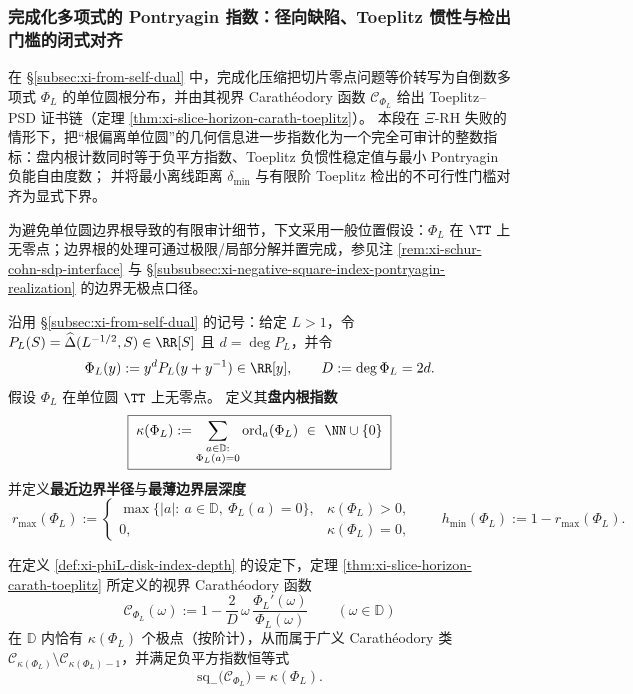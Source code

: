 \subsubsection{完成化多项式的 Pontryagin 指数：径向缺陷、Toeplitz 惯性与检出门槛的闭式对齐}\label{subsubsec:xi-completed-polynomial-pontryagin-index}
在 \S\ref{subsec:xi-from-self-dual} 中，完成化压缩把切片零点问题等价转写为自倒数多项式 \(\Phi_L\) 的单位圆根分布，并由其视界 Carath\'eodory 函数 \(\mathscr{C}_{\Phi_L}\) 给出 Toeplitz--PSD 证书链（定理 \ref{thm:xi-slice-horizon-carath-toeplitz}）。
本段在 \(\Xi\)-RH 失败的情形下，把“根偏离单位圆”的几何信息进一步指数化为一个完全可审计的整数指标：盘内根计数同时等于负平方指数、Toeplitz 负惯性稳定值与最小 Pontryagin 负能自由度数；
并将最小离线距离 \(\delta_{\min}\) 与有限阶 Toeplitz 检出的不可行性门槛对齐为显式下界。
\par
为避免单位圆边界根导致的有限审计细节，下文采用一般位置假设：\(\Phi_L\) 在 \(\TT\) 上无零点；边界根的处理可通过极限/局部分解并置完成，参见注 \ref{rem:xi-schur-cohn-sdp-interface} 与 \S\ref{subsubsec:xi-negative-square-index-pontryagin-realization} 的边界无极点口径。

\begin{definition}[盘内根指数与最近边界深度]\label{def:xi-phiL-disk-index-depth}
沿用 \S\ref{subsec:xi-from-self-dual} 的记号：给定 \(L>1\)，令
\(
P_L(S)=\widehat\Delta(L^{-1/2},S)\in\RR[S]
\)
且 \(d=\deg P_L\)，并令
\[
\Phi_L(y):=y^{d}P_L(y+y^{-1})\in\RR[y],\qquad D:=\deg\Phi_L=2d.
\]
假设 \(\Phi_L\) 在单位圆 \(\TT\) 上无零点。
定义其\textbf{盘内根指数}
\[
\boxed{\;
\kappa(\Phi_L):=\sum_{\substack{a\in\mathbb{D}:\\ \Phi_L(a)=0}}\operatorname{ord}_{a}(\Phi_L)\ \in\ \NN\cup\{0\}\;}
\]
并定义\textbf{最近边界半径}与\textbf{最薄边界层深度}
\[
\boxed{\;
r_{\max}(\Phi_L):=
\begin{cases}
\max\{|a|:\ a\in\mathbb{D},\ \Phi_L(a)=0\}, & \kappa(\Phi_L)>0,\\[2pt]
0, & \kappa(\Phi_L)=0,
\end{cases}
\qquad
h_{\min}(\Phi_L):=1-r_{\max}(\Phi_L).\;}
\]
\end{definition}

\begin{theorem}\label{thm:xi-phiL-negative-squares-equals-disk-roots}
在定义 \ref{def:xi-phiL-disk-index-depth} 的设定下，定理 \ref{thm:xi-slice-horizon-carath-toeplitz} 所定义的视界 Carath\'eodory 函数
\[
\mathscr{C}_{\Phi_L}(\omega):=1-\frac{2}{D}\,\omega\,\frac{\Phi_L'(\omega)}{\Phi_L(\omega)}
\qquad(\omega\in\mathbb{D})
\]
在 \(\mathbb{D}\) 内恰有 \(\kappa(\Phi_L)\) 个极点（按阶计），从而属于广义 Carath\'eodory 类 \(\mathcal{C}_{\kappa(\Phi_L)}\setminus\mathcal{C}_{\kappa(\Phi_L)-1}\)，并满足负平方指数恒等式
\[
\boxed{\ \mathrm{sq}_-\!\bigl(\mathscr{C}_{\Phi_L}\bigr)=\kappa(\Phi_L).\ }
\]
\end{theorem}

